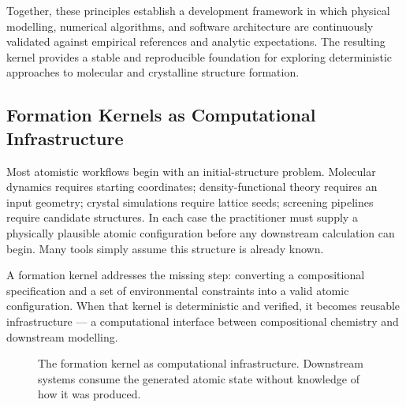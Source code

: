 \documentclass[11pt,twoside]{article}
\def\varepsilon{eps}%
\begin{document}
Together, these principles establish a development framework in which physical modelling, numerical algorithms, and software architecture are continuously validated against empirical references and analytic expectations. The resulting kernel provides a stable and reproducible foundation for exploring deterministic approaches to molecular and crystalline structure formation.

\subsection{Formation Kernels as Computational Infrastructure}
\label{sec:infrastructure}

Most atomistic workflows begin with an initial-structure problem. Molecular dynamics requires starting coordinates; density-functional theory requires an input geometry; crystal simulations require lattice seeds; screening pipelines require candidate structures. In each case the practitioner must supply a physically plausible atomic configuration before any downstream calculation can begin. Many tools simply assume this structure is already known.

A formation kernel addresses the missing step: converting a compositional specification and a set of environmental constraints into a valid atomic configuration. When that kernel is deterministic and verified, it becomes reusable infrastructure --- a computational interface between compositional chemistry and downstream modelling.

\begin{figure}[H]
\centering
{}
\caption{The formation kernel as computational infrastructure. Downstream systems consume the generated atomic state without knowledge of how it was produced.}
\label{fig:infrastructure}
\end{figure}
\end{document}
